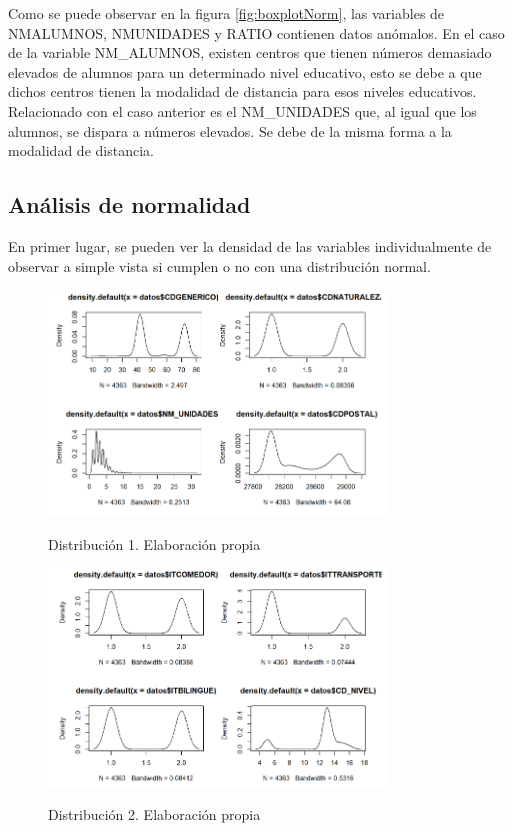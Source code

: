 \begin{subappendices}
Como se puede observar en la figura \ref{fig:boxplotNorm}, las variables de NMALUMNOS, NMUNIDADES y RATIO contienen datos anómalos. En el caso de la variable NM\_ALUMNOS, existen centros que tienen números demasiado elevados de alumnos para un determinado nivel educativo, esto se debe a que dichos centros tienen la modalidad de distancia para esos niveles educativos. Relacionado con el caso anterior es el NM\_UNIDADES que, al igual que los alumnos, se dispara a números elevados. Se debe de la misma forma a la modalidad de distancia.

\subsection{Análisis de normalidad}
En primer lugar, se pueden ver la densidad de las variables individualmente de observar a simple vista si cumplen o no con una distribución normal.

\begin{figure}[htb]
	\centering
	\caption{Distribución 1. Elaboración propia}
	\includegraphics[width=0.8\textwidth]{recursos/ImagenesR/norm1}
	\label{fig:norm1}
\end{figure}
\FloatBarrier

\begin{figure}[htb]
	\centering
	\caption{Distribución 2. Elaboración propia}
	\includegraphics[width=0.8\textwidth]{recursos/ImagenesR/norm2}
	\label{fig:norm2}
\end{figure}
\FloatBarrier


\end{subappendices}
